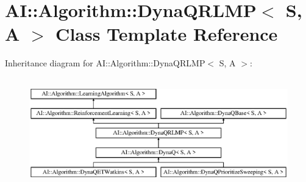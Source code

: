 \hypertarget{classAI_1_1Algorithm_1_1DynaQRLMP}{\section{A\-I\-:\-:Algorithm\-:\-:Dyna\-Q\-R\-L\-M\-P$<$ S, A $>$ Class Template Reference}
\label{classAI_1_1Algorithm_1_1DynaQRLMP}
}
Inheritance diagram for A\-I\-:\-:Algorithm\-:\-:Dyna\-Q\-R\-L\-M\-P$<$ S, A $>$\-:\begin{figure}[H]
\begin{center}
\leavevmode
\includegraphics[height=4.794520cm]{classAI_1_1Algorithm_1_1DynaQRLMP}
\end{center}
\end{figure}
